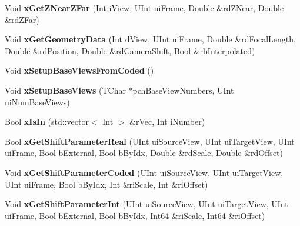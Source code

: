 \begin{DoxyCompactItemize}
Void {\bfseries x\+Get\+Z\+Near\+Z\+Far} (Int i\+View, U\+Int ui\+Frame, Double \&rd\+Z\+Near, Double \&rd\+Z\+Far)
\item 
\mbox{\label{class_t_app_com_cam_para_ab875d1e9ff6c9b338852925ce3a21d7a}} 
Void {\bfseries x\+Get\+Geometry\+Data} (Int d\+View, U\+Int ui\+Frame, Double \&rd\+Focal\+Length, Double \&rd\+Position, Double \&rd\+Camera\+Shift, Bool \&rb\+Interpolated)
\item 
\mbox{\label{class_t_app_com_cam_para_a22addf1c5948926bfebc4418cf530948}} 
Void {\bfseries x\+Setup\+Base\+Views\+From\+Coded} ()
\item 
\mbox{\label{class_t_app_com_cam_para_ab30f32adf2b5bafb494e1fb53fbcc7c1}} 
Void {\bfseries x\+Setup\+Base\+Views} (T\+Char $\ast$pch\+Base\+View\+Numbers, U\+Int ui\+Num\+Base\+Views)
\item 
\mbox{\label{class_t_app_com_cam_para_a801b4a1cd1c8dff4d200ad323d0c18d1}} 
Bool {\bfseries x\+Is\+In} (std\+::vector$<$ Int $>$ \&r\+Vec, Int i\+Number)
\item 
\mbox{\label{class_t_app_com_cam_para_ac51dc6b7231f41e032c84120ecd01781}} 
Bool {\bfseries x\+Get\+Shift\+Parameter\+Real} (U\+Int ui\+Source\+View, U\+Int ui\+Target\+View, U\+Int ui\+Frame, Bool b\+External, Bool b\+By\+Idx, Double \&rd\+Scale, Double \&rd\+Offset)
\item 
\mbox{\label{class_t_app_com_cam_para_aac4d5718fe7112b860499c5348f8db54}} 
Void {\bfseries x\+Get\+Shift\+Parameter\+Coded} (U\+Int ui\+Source\+View, U\+Int ui\+Target\+View, U\+Int ui\+Frame, Bool b\+By\+Idx, Int \&ri\+Scale, Int \&ri\+Offset)
\item 
\mbox{\label{class_t_app_com_cam_para_a644f92b0f8b3e15579e49088a5ffb5fc}} 
Void {\bfseries x\+Get\+Shift\+Parameter\+Int} (U\+Int ui\+Source\+View, U\+Int ui\+Target\+View, U\+Int ui\+Frame, Bool b\+External, Bool b\+By\+Idx, Int64 \&ri\+Scale, Int64 \&ri\+Offset)
\item 
\mbox{\label{class_t_app_com_cam_para_adc0e0d2a97f750d638cf39df3229c756}} 

\end{DoxyCompactItemize}
